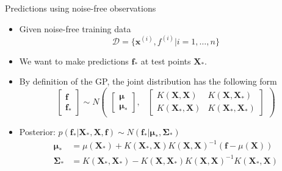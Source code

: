 \documentclass[10pt,mathserif]{beamer}
\begin{document}
\begin{frame}{Predictions using noise-free observations}
\begin{itemize}
    \item Given noise-free training data
    \begin{equation*}
        \mathcal{D} = \{\bm{x}^{(i)}, f^{(i)} | i = 1,\ldots, n\}
    \end{equation*}
    \item We want to make predictions $\bm{f}_*$ at test points $\bm{X}_*$.
    \item By definition of the GP, the joint distribution has the following form
    \begin{equation*}
        \begin{bmatrix}
        \bm{f}\\
        \bm{f}_*
        \end{bmatrix} 
         \sim N
        \begin{pmatrix}
            \begin{bmatrix}
            \bm{\mu}\\
            \bm{\mu}_*
            \end{bmatrix}\!\!,&
            \begin{bmatrix}
            K(\bm{X}, \bm{X}) & K(\bm{X}, \bm{X}_*)\\
            K(\bm{X}_*, \bm{X}) & K(\bm{X}_*, \bm{X}_*)
            \end{bmatrix}
        \end{pmatrix}
    \end{equation*}
    \item Posterior: $ p(\bm{f}_*|\bm{X}_*, \bm{X},\bm{f}) \sim N (\bm{f}_*|\bm{\mu}_*, \bm{\Sigma}_*) $
    \begin{equation*}
        \begin{split}
            \bm{\mu}_* &   = \mu(\bm{X}_*) + K(\bm{X}_*, \bm{X}) K(\bm{X}, \bm{X})^{-1}(\bm{f} - \mu(\bm{X})) \\
            \bm{\Sigma}_* &  = K(\bm{X}_*, \bm{X}_*) - K(\bm{X}, \bm{X}_*) K(\bm{X}, \bm{X})^{-1} K(\bm{X}_*, \bm{X})
        \end{split}
    \end{equation*} 
\end{itemize}    
\end{frame}
\end{document}
